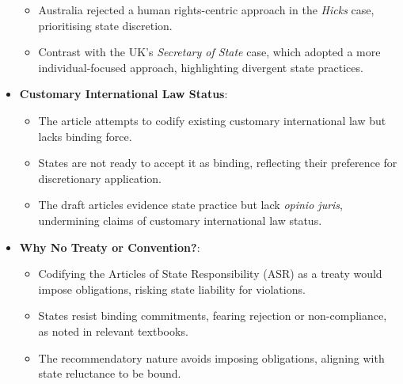 \begin{itemize}
    \begin{itemize}
        \item Australia rejected a human rights-centric approach in the \textit{Hicks} case, prioritising state discretion.
        \item Contrast with the UK’s \textit{Secretary of State} case, which adopted a more individual-focused approach, highlighting divergent state practices.
    \end{itemize}
    \item \textbf{Customary International Law Status}:
    \begin{itemize}
        \item The article attempts to codify existing customary international law but lacks binding force.
        \item States are not ready to accept it as binding, reflecting their preference for discretionary application.
        \item The draft articles evidence state practice but lack \textit{opinio juris}, undermining claims of customary international law status.
    \end{itemize}
    \item \textbf{Why No Treaty or Convention?}:
    \begin{itemize}
        \item Codifying the Articles of State Responsibility (ASR) as a treaty would impose obligations, risking state liability for violations.
        \item States resist binding commitments, fearing rejection or non-compliance, as noted in relevant textbooks.
        \item The recommendatory nature avoids imposing obligations, aligning with state reluctance to be bound.
    \end{itemize}
\end{itemize}

